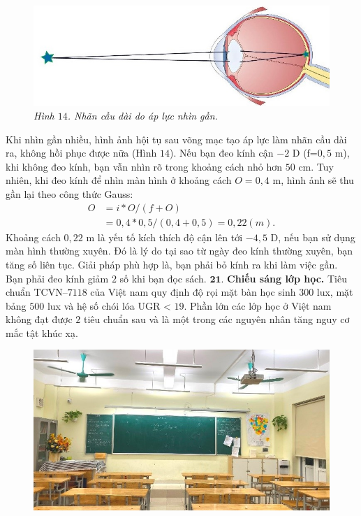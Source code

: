 \begin{multicols}{2}
\begin{figure}[H]
		\centering
		\captionsetup{labelformat= empty, justification=centering}
		\includegraphics[width= 1\linewidth]{14}
		\caption{\small\textit{\color{timhieukhoahoc}Hình $14$. Nhãn cầu dài do áp lực nhìn gần.}}
		\vspace*{-10pt}
	\end{figure}
	Khi nhìn gần nhiều, hình ảnh hội tụ sau võng mạc tạo áp lực làm nhãn cầu dài ra, không hồi phục được nữa (Hình $14$). Nếu bạn đeo kính cận $-2$ D (f=$0{,}5$ m), khi không đeo kính, bạn vẫn nhìn rõ trong khoảng cách nhỏ hơn $50$ cm. Tuy nhiên, khi đeo kính để nhìn màn hình ở khoảng cách $O=0{,}4$ m, hình ảnh sẽ thu gần lại theo công thức Gauss: 
	\begin{align*}
		O&=i*O/(f+O) \\
		&= 0{,}4*0{,}5/(0,4+0,5) = 0,22 (m).
	\end{align*}
	Khoảng cách $0{,}22$ m là yếu tố kích thích độ cận lên tới $-4{,}5$ D, nếu bạn sử dụng màn hình thường xuyên. Đó là lý do tại sao từ ngày đeo kính thường xuyên, bạn tăng số liên tục.
	\vskip 0.1cm
	Giải pháp phù hợp là, bạn phải bỏ kính ra khi làm việc gần. Bạn phải đeo kính giảm $2$ số khi bạn đọc sách. 
	\vskip 0.1cm
	$\pmb{21.}$ \textbf{\color{timhieukhoahoc}Chiếu sáng lớp học.}
	\vskip 0.1cm
	Tiêu chuẩn TCVN--$7118$ của Việt nam quy định độ rọi mặt bàn học sinh $300$ lux, mặt bảng $500$ lux và hệ số chói lóa UGR < $19$. Phần lớn các lớp học ở Việt nam không đạt được $2$ tiêu chuẩn sau và là một trong các nguyên nhân tăng nguy cơ mắc tật khúc xạ.
	\begin{figure}[H]
		\vspace*{5pt}
		\centering
		\captionsetup{labelformat= empty, justification=centering}
		\includegraphics[width= 1\linewidth]{15}

\end{figure}
\end{multicols}
